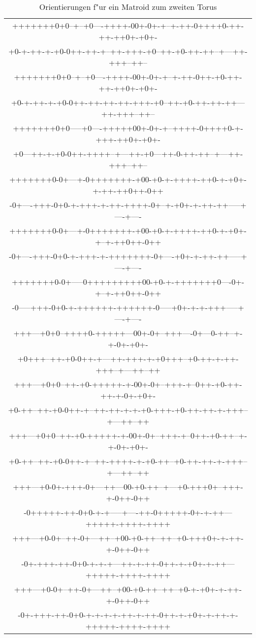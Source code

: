 \begin{table}%
\begin{center}
{\scriptsize\tt\begin{tabular}{c}
+++++++0+0--+--+0----++++-00+-0+-+--+-++-0++++0-++-++-++0+-+0+-\\
+0-+-++-+-+0-0++-++-+--++-+++-+0--++-+0-++-++--+---++-+++--++--\\[1mm]
+++++++0+0--+--+0----++++-00+-0+-+--+-++-0++-+0-++-++-++0+-+0+-\\
+0-+-++-+-+0-0++-++-++-++-+++-+0--++-+0-++-++-++---++-+++--++--\\[1mm]
+++++++0+0-----+0----+++++00+-0+-+--++++-0++++0-+-+++-++0+-+0+-\\
+0---++-+-+0-0++-++++--+---++-+0---++-0-++-++--+---++-+++--++--\\[1mm]
+++++++0-0+---+-0+++++++-+00-+0-+-++++-++0-+-+0+-+-++-++0++-0++\\
-0+----+++-0+0-+-+++-+-++-++++-0+--+-+0+-+-++-++-----+----+----\\[1mm]
+++++++0-0+---+-0+++++++-+00-+0-+-++++-++0-+-+0+-+--+-++0++-0++\\
-0+----+++-0+0-+-+++-+-+++++++-0+----+0+-+-++-++-----+----+----\\[1mm]
+++++++0-0+-----0+++++++++00-+0-+-+++++++0----0+-+--+-++0++-0++\\
-0-----+++-0+0-+-++++++-++++++-0-----+0+-+-+-+++-----+----+----\\[1mm]
+++---+0+0--++++0-+++++---00+-0+--+++----0+---0-++--+-+-0+-+0+-\\
+0+++--++-+0-0++-+---++-+++-+-+0+++--+0-++-+-++-+++--+---++--++\\[1mm]
+++---+0+0--++-+0-+++++-+-00+-0+--+++-+--0++-+0-++-++-+-0+-+0+-\\
+0-++--++-+0-0++-+--++-++-+-+-+0-+++-+0-++-++-+-+++--+---++--++\\[1mm]
+++---+0+0--++-+0-+++++-+-00+-0+--+++-+--0++-+0-++--+-+-0+-+0+-\\
+0-++--++-+0-0++-+--++-++++-+-+0-++--+0-++-++-+-+++--+---++--++\\[1mm]
+++---+0-0+-+++-0+---++---00-+0-++--+---+0-+++0+--+++-+-0++-0++\\
-0+++++-++-0+0-+-+-----+----++-0+++++-0+-+-++---+++++-++++-++++\\[1mm]
+++---+0-0+--++-0+---++--+00-+0-++--++--+0-+++0+-+-++-+-0++-0++\\
-0+-+++-++-0+0-+-+-+---++-+-++-0++-+-+0+-+-++---+++++-++++-++++\\[1mm]
+++---+0-0+--++-0+---++--+00-+0-++--++--+0-+-+0+-+-++-+-0++-0++\\
-0+-+++-++-0+0-+-+-+-+-++-+-++-0++-+-+0+-+-++-+-+++++-++++-++++
\end{tabular}}
\end{center}
\caption{\label{orimattor}Orientierungen f"ur ein Matroid zum zweiten Torus}
\end{table}

